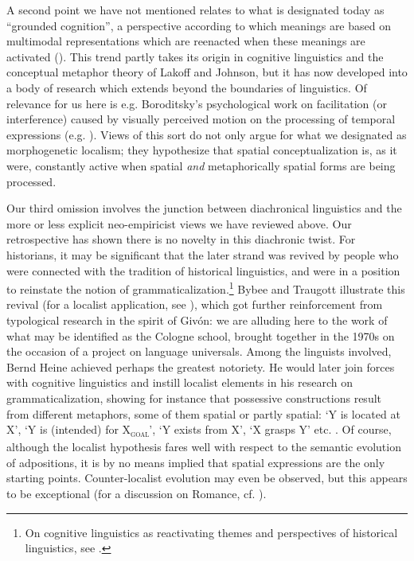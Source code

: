 \documentclass[english,output=paper,colorlinks,citecolor=brown]{../langscibook}
\begin{document}
A second point we have not mentioned relates to what is designated today as “grounded cognition”, a perspective according to which meanings are based on multimodal representations which are reenacted when these meanings are activated (\citealt{Barsalou2008}). This trend partly takes its origin in cognitive linguistics and the conceptual metaphor theory of Lakoff and Johnson, but it has now developed into a body of research which extends beyond the boundaries of linguistics. Of relevance for us here is e.g. Boroditsky’s psychological work on facilitation (or interference) caused by visually perceived motion on the processing of temporal expressions (e.g. \citealt{Boroditsky2001}). Views of this sort do not only argue for what we designated as morphogenetic localism; they hypothesize that spatial conceptualization is, as it were, constantly active when spatial \textit{and} metaphorically spatial forms are being processed.

Our third omission involves the junction between diachronical linguistics and the more or less explicit neo-empiricist views we have reviewed above. Our retrospective has shown there is no novelty in this diachronic twist. For historians, it may be significant that the later strand was revived by people who were connected with the tradition of historical linguistics, and were in a position to reinstate the notion of grammaticalization.\footnote{On cognitive linguistics as reactivating themes and perspectives of historical linguistics, see \citet{Geeraerts2010}.} Bybee and Traugott illustrate this revival (for a localist application, see \citealt{Traugott1975}), which got further reinforcement from typological research in the spirit of Givón: we are alluding here to the work of what may be identified as the Cologne school, brought together in the 1970s on the occasion of a project on language universals. Among the linguists involved, Bernd Heine achieved perhaps the greatest notoriety. He would later join forces with cognitive linguistics and instill localist elements in his research on grammaticalization, showing for instance that possessive constructions result from different metaphors, some of them spatial or partly spatial: ‘Y is located at X’, ‘Y is (intended) for X\textsubscript{\textsc{goal}}’, ‘Y exists from X’, ‘X grasps Y’ etc. \citep{Heine1997}. Of course, although the localist hypothesis fares well with respect to the semantic evolution of adpositions, it is by no means implied that spatial expressions are the only starting points. Counter-localist evolution may even be observed, but this appears to be exceptional (for a discussion on Romance, cf. \citealt{Fagard2010}).
\end{document}
